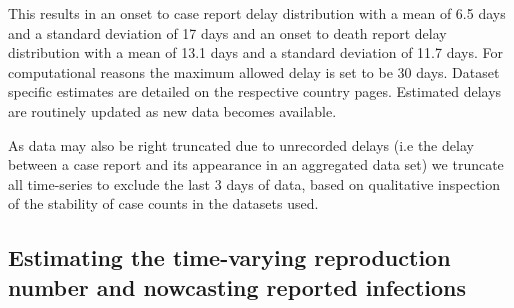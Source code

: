 \documentclass[
]{article}
\begin{document}
This results in an onset to case report delay distribution with a mean
of 6.5 days and a standard deviation of 17 days and an onset to death
report delay distribution with a mean of 13.1 days and a standard
deviation of 11.7 days. For computational reasons the maximum allowed
delay is set to be 30 days. Dataset specific estimates are detailed on
the respective country pages. Estimated delays are routinely updated as
new data becomes available.

As data may also be right truncated due to unrecorded delays (i.e the
delay between a case report and its appearance in an aggregated data
set) we truncate all time-series to exclude the last 3 days of data,
based on qualitative inspection of the stability of case counts in the
datasets used.

\hypertarget{estimating-the-time-varying-reproduction-number-and-nowcasting-reported-infections}{%
\subsection{Estimating the time-varying reproduction number and
nowcasting reported
infections}\label{estimating-the-time-varying-reproduction-number-and-nowcasting-reported-infections}}
\end{document}
